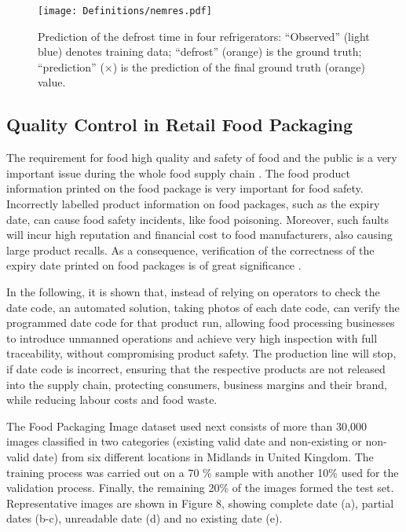 \documentclass[journal,article,accept,moreauthors,pdftex]{Definitions/mdpi}
\begin{document}
\begin{figure*}[tph!]
\texttt{[image: Definitions/nemres.pdf]}
\centering
\caption{Prediction of the defrost time in four refrigerators: “Observed” (light blue) denotes  training data;  “defrost” (orange) is the ground truth; “prediction” (×) is the prediction of the final ground truth (orange) value. }
\label{nemres}
\end{figure*}

\subsection{Quality Control in Retail Food Packaging}

The requirement for food high quality and safety of food and the public 
is a very important issue during the whole food supply chain \cite{ref46}.
The food product information printed on the food package 
is very important for food safety. Incorrectly labelled product
information on food packages, such as the expiry date,
can cause food safety incidents, like food poisoning.  Moreover, such faults will incur high
reputation and financial cost to food manufacturers, also causing
large product recalls. As a consequence,  verification of the correctness of
the expiry date printed on food packages is of great significance .

In the following, it is shown that, instead of relying on operators to check the date code, an automated solution,  taking photos of each date code, can verify the programmed date code for that product run, allowing food processing businesses to introduce unmanned operations and achieve very high inspection with full traceability,  without compromising product safety. The production line will stop, if date code is incorrect, ensuring that the respective products  are not released into the supply chain, protecting consumers, business margins and their brand, while  reducing labour costs and food waste. 

The Food Packaging Image dataset used next consists of more than 30,000 images classified in two categories (existing valid date and non-existing or non-valid date) from six different locations in Midlands in United Kingdom. The training process was carried out on a 70 \% sample
with another 10\% used for the validation process. Finally, the remaining 20\% of the images formed the test set. Representative images are shown in Figure 8, showing  complete date (a), partial dates (b-c), unreadable date (d) and no existing date (e).
\end{document}
